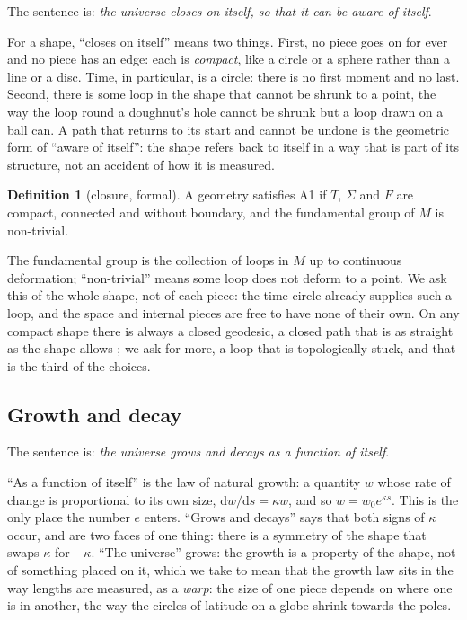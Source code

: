 \documentclass[11pt,a4paper]{article}
\theoremstyle{plain}
\theoremstyle{definition}
\newtheorem{definition}[theorem]{Definition}
\theoremstyle{remark}
\begin{document}
The sentence is: \emph{the universe closes on itself, so that it can be aware of itself}.

For a shape, ``closes on itself'' means two things. First, no piece goes on for ever and no piece has an edge: each is \emph{compact}, like a circle or a sphere rather than a line or a disc. Time, in particular, is a circle: there is no first moment and no last. Second, there is some loop in the shape that cannot be shrunk to a point, the way the loop round a doughnut's hole cannot be shrunk but a loop drawn on a ball can. A path that returns to its start and cannot be undone is the geometric form of ``aware of itself'': the shape refers back to itself in a way that is part of its structure, not an accident of how it is measured.

\begin{definition}[closure, formal]\label{def:A1}
A geometry satisfies A1 if $T$, $\Sigma$ and $F$ are compact, connected and without boundary, and the fundamental group of $M$ is non-trivial.
\end{definition}

The fundamental group is the collection of loops in $M$ up to continuous deformation; ``non-trivial'' means some loop does not deform to a point. We ask this of the whole shape, not of each piece: the time circle already supplies such a loop, and the space and internal pieces are free to have none of their own. On any compact shape there is always a closed geodesic, a closed path that is as straight as the shape allows \cite{LyusternikFet}; we ask for more, a loop that is topologically stuck, and that is the third of the choices.

\subsection{Growth and decay}\label{sec:A2}

The sentence is: \emph{the universe grows and decays as a function of itself}.

``As a function of itself'' is the law of natural growth: a quantity $w$ whose rate of change is proportional to its own size, $\mathrm{d}w/\mathrm{d}s=\kappa w$, and so $w=w_{0}e^{\kappa s}$. This is the only place the number $e$ enters. ``Grows and decays'' says that both signs of $\kappa$ occur, and are two faces of one thing: there is a symmetry of the shape that swaps $\kappa$ for $-\kappa$. ``The universe'' grows: the growth is a property of the shape, not of something placed on it, which we take to mean that the growth law sits in the way lengths are measured, as a \emph{warp}: the size of one piece depends on where one is in another, the way the circles of latitude on a globe shrink towards the poles.
\end{document}

